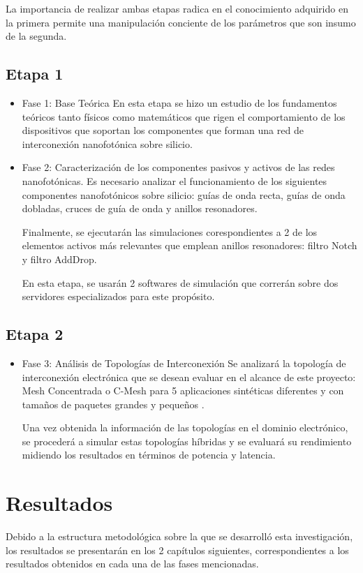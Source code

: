 La importancia de realizar ambas etapas radica en el conocimiento adquirido en la primera
 permite una manipulación conciente de los parámetros que son insumo de la segunda. 


\subsection{Etapa 1}
\begin{itemize}
\item Fase 1: Base Teórica
En esta etapa se hizo un estudio de los fundamentos teóricos tanto físicos
como matemáticos que rigen el comportamiento de los dispositivos que soportan
los componentes que forman una red de interconexión nanofotónica sobre silicio. 

\item Fase 2: Caracterización de los componentes pasivos y activos de las redes nanofotónicas. 
Es necesario analizar el funcionamiento de los siguientes componentes 
nanofotónicos sobre silicio: guías de onda recta, guías de onda dobladas, cruces de guía de onda 
y anillos resonadores.

Finalmente, se ejecutarán las simulaciones corespondientes a 
2 de los elementos activos más relevantes que
emplean anillos resonadores: filtro Notch y filtro AddDrop.

En esta etapa, se usarán 2 softwares de simulación que correrán 
sobre dos servidores especializados para este propósito. 
\end{itemize} 

\subsection{Etapa 2} 
\begin{itemize}
\item Fase 3: Análisis de Topologías de Interconexión
Se analizará la topología de interconexión electrónica 
que se desean evaluar en el alcance de este proyecto: Mesh Concentrada o C-Mesh
para 5 aplicaciones
sintéticas diferentes y con tamaños de paquetes grandes y pequeños
.

Una vez obtenida la información de las topologías en el dominio electrónico, 
se procederá a simular estas topologías híbridas y se evaluará su rendimiento
midiendo los resultados en términos de potencia y latencia.

\end{itemize} 

\section{Resultados}

Debido a la estructura metodológica sobre la que se desarrolló esta investigación,
los resultados se presentarán en los 2 capítulos siguientes, correspondientes a 
los resultados obtenidos en cada una de las fases mencionadas.
